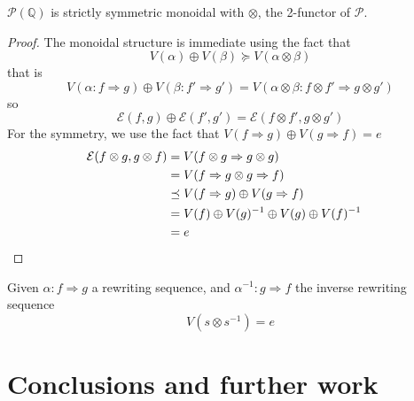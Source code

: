 \documentclass[a4paper]{article}
\begin{document}
\begin{proposition}
$\mathcal{P}(\mathbb{Q})$ is strictly symmetric monoidal with $\otimes$, the
  2-functor of $\mathcal{P}$.

\begin{proof}
The monoidal structure is immediate using the fact that
\[
V(\alpha) \oplus V(\beta) \succeq V(\alpha \otimes \beta)
\]
that is
\[
V(\alpha: f \Rightarrow g) \oplus V(\beta: f' \Rightarrow g') = V(\alpha \otimes
  \beta: f \otimes f' \Rightarrow g \otimes g')
\]
so
\[
\mathcal{E}(f, g) \oplus \mathcal{E}(f', g') = \mathcal{E}(f \otimes f', g
  \otimes g')
\]
For the symmetry, we use the fact that $V(f \Rightarrow g) \oplus V(g
  \Rightarrow f) = e$
\begin{align}
\mathcal{E}(f \otimes g, g \otimes f) &= V(f \otimes g \Rightarrow g \otimes g)
  \cr
&= V(f \Rightarrow g \otimes g \Rightarrow f) \cr
&\preceq V(f \Rightarrow g) \oplus V(g \Rightarrow f) \cr
&= V(f) \oplus V(g)^{-1} \oplus V(g) \oplus V(f)^{-1} \cr
&= e
\end{align}
\end{proof}
\end{proposition}

\begin{corollary}
Given $\alpha: f \Rightarrow g$ a rewriting sequence, and $\alpha^{-1}: g
  \Rightarrow f$ the inverse rewriting sequence
\[
V(s \otimes s^{-1}) = e
\]
\end{corollary}


\section{Conclusions and further work}
\label{sec:conclusion}



\small

\end{document}
